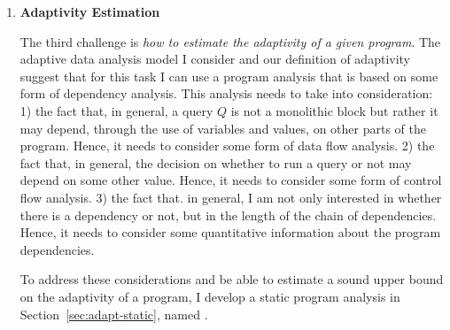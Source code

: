 \begin{enumerate}
\item 
\textbf{Adaptivity Estimation}

The third challenge is \emph{how to estimate the adaptivity of a given program}. 
The adaptive data analysis model I consider and our definition of adaptivity suggest that for this task 
I can use a program analysis that is based on some form of dependency analysis.
 This analysis needs to take into consideration:
1) the fact that, in general, a query $Q$ is not a monolithic block but rather it may depend, through the use of variables and values, on other parts of the program. 
Hence, it needs to consider some form of data flow analysis. 
2) the fact that, in general, the decision on whether to run a query or not may depend on some other value. Hence, 
 it needs to consider some form of control flow analysis.
3) the fact that. in general, I am not only interested in whether there is a dependency or not, but in the length of the chain of dependencies. 
Hence, it needs to consider some quantitative information about the program dependencies. %

To address these considerations and be able to estimate a sound upper bound on the adaptivity of a program, 
I develop a static program analysis in Section~\ref{sec:adapt-static}, named {\THESYSTEM}.
\end{enumerate}
%
